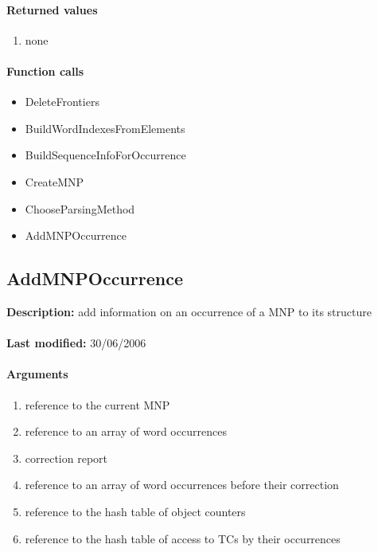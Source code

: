 \paragraph{Returned values}
\begin{enumerate}
\item none
\end{enumerate}

\paragraph{Function calls}
\begin{itemize}
\item DeleteFrontiers
\item BuildWordIndexesFromElements
\item BuildSequenceInfoForOccurrence
\item CreateMNP
\item ChooseParsingMethod
\item AddMNPOccurrence
\end{itemize}

\subsection{AddMNPOccurrence}
\textbf{Description:} add information on an occurrence of a MNP to its structure\\
\\\textbf{Last modified:} 30/06/2006

\paragraph{Arguments}
\begin{enumerate}
\item reference to the current MNP
\item reference to an array of word occurrences
\item correction report
\item reference to an array of word occurrences before their correction
\item reference to the hash table of object counters
\item reference to the hash table of access to TCs by their occurrences
\end{enumerate}

